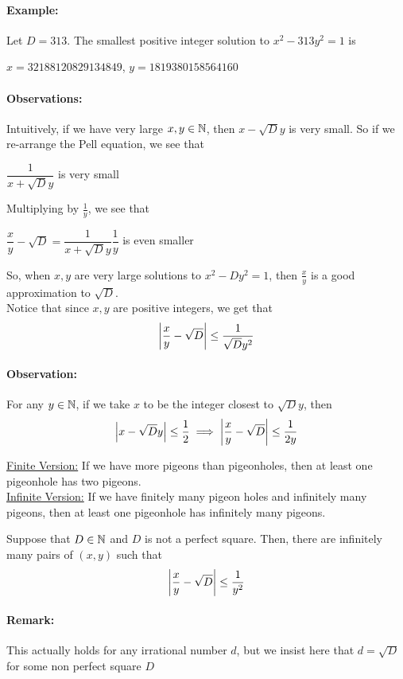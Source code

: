 \documentclass[../main.tex]{subfiles}
\begin{document}
\paragraph{Example:} Let $D=313$. The smallest positive integer solution to $x^2-313y^2=1$ is \\ \centerline{$x=32188120829134849$, $y=1819380158564160$}
\paragraph{Observations:} Intuitively, if we have very large $x,y \in \mathbb{N}$, then $x-\sqrt{D}y$ is very small. So if we re-arrange the Pell equation, we see that \\ \centerline{$\dfrac{1}{x+\sqrt{D}y}$ is very small} Multiplying by $\tfrac{1}{y}$, we see that \\ \centerline{$\dfrac{x}{y}-\sqrt{D}=\dfrac{1}{x+\sqrt{D}y}\dfrac{1}{y}$ is even smaller} So, when $x,y$ are very large solutions to $x^2-Dy^2=1$, then $\tfrac{x}{y}$ is a good approximation to $\sqrt{D}$. \\ Notice that since $x,y$ are positive integers, we get that $$\abs{\dfrac{x}{y}-\sqrt{D}} \leq \dfrac{1}{\sqrt{D}y^2}$$
\paragraph{Observation:} For any $y \in \mathbb{N}$, if we take $x$ to be the integer closest to $\sqrt{D}y$, then $$\abs{x-\sqrt{D}y} \leq \dfrac{1}{2} \implies \abs{\dfrac{x}{y}-\sqrt{D}} \leq \dfrac{1}{2y}$$


\begin{thm}
    \underline{Finite Version:} If we have more pigeons than pigeonholes, then at least one pigeonhole has two pigeons. \\
    \underline{Infinite Version:} If we have finitely many pigeon holes and infinitely many pigeons, then at least one pigeonhole has infinitely many pigeons.
\end{thm}

\begin{thm}
    Suppose that $D \in \mathbb{N}$ and $D$ is not a perfect square. Then, there are infinitely many pairs of $(x,y)$ such that $$\abs{\dfrac{x}{y}-\sqrt{D}} \leq \dfrac{1}{y^2}$$ 
\end{thm}
\paragraph{Remark:} This actually holds for any irrational number $d$, but we insist here that $d=\sqrt{D}$ for some non perfect square $D$
\end{document}
